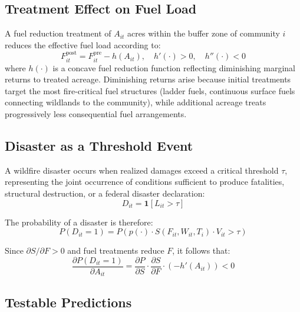 \documentclass[12pt, letterpaper]{article}
\begin{document}
\subsection{Treatment Effect on Fuel Load}

A fuel reduction treatment of $A_{it}$ acres within the buffer zone of community $i$ reduces the effective fuel load according to:
\begin{equation}
    F_{it}^{\text{post}} = F_{it}^{\text{pre}} - h(A_{it}), \quad h'(\cdot) > 0, \quad h''(\cdot) < 0
    \label{eq:fuel_reduction}
\end{equation}
where $h(\cdot)$ is a concave fuel reduction function reflecting diminishing marginal returns to treated acreage. Diminishing returns arise because initial treatments target the most fire-critical fuel structures (ladder fuels, continuous surface fuels connecting wildlands to the community), while additional acreage treats progressively less consequential fuel arrangements.

\subsection{Disaster as a Threshold Event}

A wildfire disaster occurs when realized damages exceed a critical threshold $\tau$, representing the joint occurrence of conditions sufficient to produce fatalities, structural destruction, or a federal disaster declaration:
\begin{equation}
    D_{it} = \mathbf{1}\left[L_{it} > \tau\right]
    \label{eq:disaster}
\end{equation}

The probability of a disaster is therefore:
\begin{equation}
    P(D_{it} = 1) = P\left(p(\cdot) \cdot S(F_{it}, W_{it}, T_i) \cdot V_{it} > \tau\right)
    \label{eq:disaster_prob}
\end{equation}

Since $\partial S / \partial F > 0$ and fuel treatments reduce $F$, it follows that:
\begin{equation}
    \frac{\partial P(D_{it} = 1)}{\partial A_{it}} = \frac{\partial P}{\partial S} \cdot \frac{\partial S}{\partial F} \cdot \left(-h'(A_{it})\right) < 0
    \label{eq:extensive_prediction}
\end{equation}

\subsection{Testable Predictions}
\end{document}
